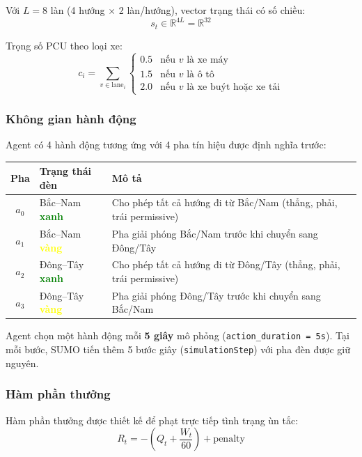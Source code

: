 Với $L = 8$ làn (4 hướng $\times$ 2 làn/hướng), vector trạng thái có số chiều:
\[
s_t \in \mathbb{R}^{4L} = \mathbb{R}^{32}
\]

Trọng số PCU theo loại xe:
\[
c_i = \sum_{v \in \text{lane}_i}
\begin{cases}
0.5 & \text{nếu } v \text{ là xe máy} \\
1.5 & \text{nếu } v \text{ là ô tô} \\
2.0 & \text{nếu } v \text{ là xe buýt hoặc xe tải}
\end{cases}
\]

\subsubsection{Không gian hành động}

Agent có 4 hành động tương ứng với 4 pha tín hiệu được định nghĩa trước:

\begin{center}
\begin{tabular}{|c|l|l|}
\hline
\textbf{Pha} & \textbf{Trạng thái đèn} & \textbf{Mô tả} \\
\hline
$a_0$ & Bắc--Nam \textcolor{green}{\textbf{xanh}} & Cho phép tất cả hướng đi từ Bắc/Nam (thẳng, phải, trái permissive) \\
$a_1$ & Bắc--Nam \textcolor{yellow}{\textbf{vàng}} & Pha giải phóng Bắc/Nam trước khi chuyển sang Đông/Tây \\
$a_2$ & Đông--Tây \textcolor{green}{\textbf{xanh}} & Cho phép tất cả hướng đi từ Đông/Tây (thẳng, phải, trái permissive) \\
$a_3$ & Đông--Tây \textcolor{yellow}{\textbf{vàng}} & Pha giải phóng Đông/Tây trước khi chuyển sang Bắc/Nam \\
\hline
\end{tabular}
\end{center}

\vspace{6pt}
Agent chọn một hành động mỗi \textbf{5 giây} mô phỏng (\texttt{action\_duration = 5s}). Tại mỗi bước, SUMO tiến thêm 5 bước giây (\texttt{simulationStep}) với pha đèn được giữ nguyên.

\subsubsection{Hàm phần thưởng}

Hàm phần thưởng được thiết kế để phạt trực tiếp tình trạng ùn tắc:
\[
R_t = -\left(Q_t + \frac{W_t}{60}\right) + \text{penalty}
\]

